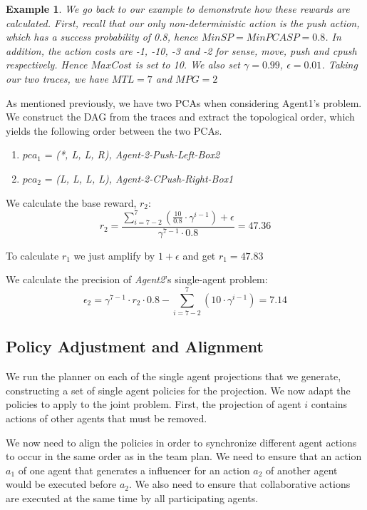 \documentclass[letterpaper]{article} %
\newtheorem{example}{Example}
\begin{document}
\begin{example}
We go back to our example to demonstrate how these rewards are calculated.
First, recall that our only non-deterministic action is the push action, which has a success probability of 0.8, hence $MinSP=MinPCASP=0.8$. In addition, the action costs are -1, -10, -3 and -2 for sense, move, push and cpush respectively. Hence $MaxCost$ is set to 10. We also set $\gamma=0.99$, $\epsilon=0.01$.
Taking our two traces, we have $MTL=7$ and $MPG=2$
\end{example}

As mentioned previously, we have two PCAs when considering Agent1's problem.
We construct the DAG from the traces and extract the topological order, which yields the following order between the two PCAs.
\begin{enumerate}
    \item $pca_1$ = \emph{(*, L, L, R), Agent-2-Push-Left-Box2}
    \item $pca_2$ = \emph{(L, L, L, L), Agent-2-CPush-Right-Box1}
\end{enumerate}


We calculate the base reward, $r_2$:
\begin{equation}
     r_2 = \frac{\sum_{i=7-2}^{7}(\frac{10}{0.8} \cdot \gamma^{i-1})+ \epsilon}{\gamma^{7-1}\cdot 0.8} = 47.36
\end{equation}

To calculate $r_1$ we just amplify by $1+\epsilon$ and get $r_1=47.83$

We calculate the precision of \emph{Agent2}'s single-agent problem: \begin{equation}
     \epsilon_2 = \gamma^{7-1}\cdot r_2 \cdot 0.8 - \sum_{i=7-2}^{7}(10 \cdot \gamma^{i-1}) = 7.14
\end{equation}

\subsection{Policy Adjustment and Alignment}

We run the planner on each of the single agent projections that we generate, constructing a set of single agent policies for the projection. We now adapt the policies to apply to the joint problem. First, the projection of agent $i$ contains actions of other agents that must be removed.

We now need to align the policies in order to synchronize different agent actions to occur in the same order as in the team plan. We need to ensure that an action $a_1$ of one agent that generates a influencer for an action $a_2$ of another agent would be executed before $a_2$. We also need to ensure that collaborative actions are executed at the same time by all participating agents. 
\end{document}
